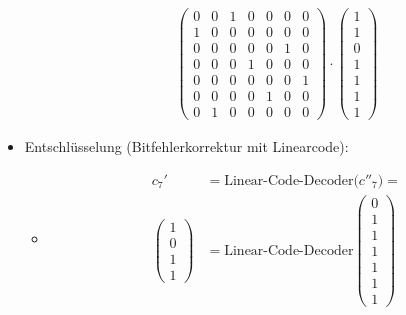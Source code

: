\begin{itemize}
\begin{itemize}
\begin{align*}
\begin{pmatrix}
                0 & 0 & 1 & 0 & 0 & 0 & 0\\
                1 & 0 & 0 & 0 & 0 & 0 & 0\\
                0 & 0 & 0 & 0 & 0 & 1 & 0\\
                0 & 0 & 0 & 1 & 0 & 0 & 0\\
                0 & 0 & 0 & 0 & 0 & 0 & 1\\
                0 & 0 & 0 & 0 & 1 & 0 & 0\\
                0 & 1 & 0 & 0 & 0 & 0 & 0
            \end{pmatrix}
            \cdot
            \begin{pmatrix} %
                1\\
                1\\
                0\\
                1\\
                1\\
                1\\
                1
            \end{pmatrix}
        \end{align*}
    \end{itemize}
    \item Entschlüsselung (Bitfehlerkorrektur mit Linearcode):
    \begin{itemize}
        \item[]
        \begin{align*}
            c_{7}'\,&=\text{Linear-Code-Decoder($c''_7$)}=\\
            \begin{pmatrix} %
                1\\
                0\\
                1\\
                1
            \end{pmatrix}
            &=\text{Linear-Code-Decoder}
            \begin{pmatrix}
                0\\
                1\\
                1\\
                1\\
                1\\
                1\\
                1
            \end{pmatrix}
        \end{align*}
    \end{itemize}

\end{itemize}
